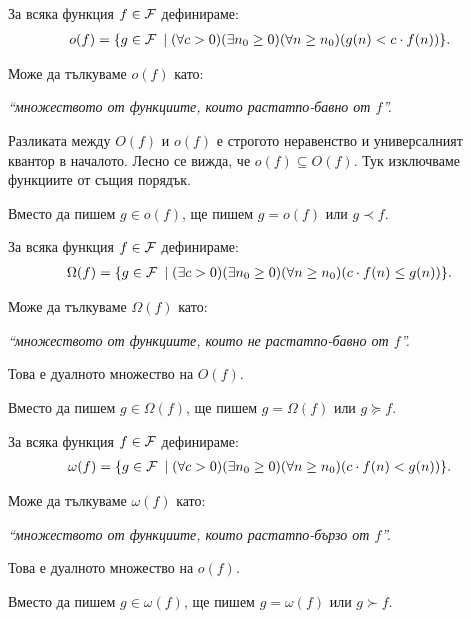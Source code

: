 \begin{definition}
  За всяка функция $f \in \mathcal{F}$ дефинираме:
  \begin{align*}
    o(f) = \{ g \in \mathcal{F} \: \mid (\forall c > 0)(\exists n_0 \geq 0)(\forall n \geq n_0)(g(n) < c \cdot f(n))\}.
  \end{align*}
\end{definition}
Може да тълкуваме $o(f)$ като:
\begin{center}
  \textit{``множеството от функциите, които растат\footnotemark[1] по-бавно от $f$''.}
\end{center}
Разликата между $O(f)$ и $o(f)$ е строгото неравенство и универсалният квантор в началото.
Лесно се вижда, че $o(f) \subseteq O(f)$.
Тук изключваме функциите от същия порядък.
\begin{remark}
  Вместо да пишем $g \in o(f)$, ще пишем $g = o(f)$ или $g \prec f$.
\end{remark}

\begin{definition}
  За всяка функция $f \in \mathcal{F}$ дефинираме:
  \begin{align*}
    \Omega(f) = \{ g \in \mathcal{F} \: \mid (\exists c > 0)(\exists n_0 \geq 0)(\forall n \geq n_0)(c \cdot f(n) \leq g(n))\}.
  \end{align*}
\end{definition}
Може да тълкуваме $\Omega(f)$ като:
\begin{center}
  \textit{``множеството от функциите, които не растат\footnotemark[1] по-бавно от $f$''.}
\end{center}
Това е дуалното множество на $O(f)$.
\begin{remark}
  Вместо да пишем $g \in \Omega(f)$, ще пишем $g = \Omega(f)$ или $g \succeq f$.
\end{remark}

\begin{definition}
  За всяка функция $f \in \mathcal{F}$ дефинираме:
  \begin{align*}
    \omega(f) = \{ g \in \mathcal{F} \: \mid (\forall c > 0)(\exists n_0 \geq 0)(\forall n \geq n_0)(c \cdot f(n) < g(n))\}.
  \end{align*}
\end{definition}
Може да тълкуваме $\omega(f)$ като:
\begin{center}
  \textit{``множеството от функциите, които растат\footnotemark[1] по-бързо от $f$''.}
\end{center}
Това е дуалното множество на $o(f)$.
\begin{remark}
  Вместо да пишем $g \in \omega(f)$, ще пишем $g = \omega(f)$ или $g \succ f$.
\end{remark}

